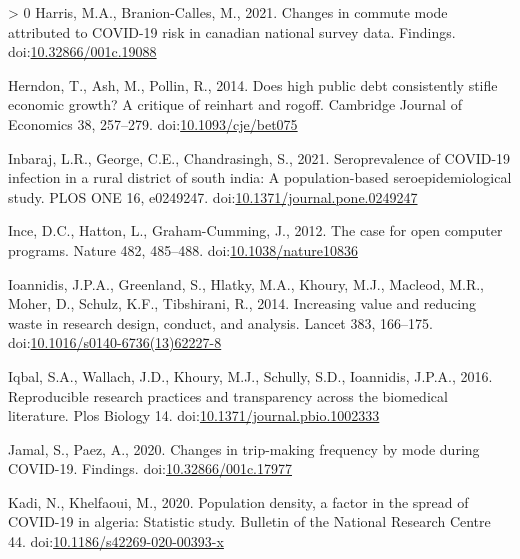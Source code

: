 \documentclass[]{elsarticle} %
\newlength{\cslhangindent}
\newenvironment{CSLReferences}[3] %
 {%
  \setlength{\parindent}{0pt}
  \ifodd #1 \everypar{\setlength{\hangindent}{\cslhangindent}}\ignorespaces\fi
  \ifnum #2 > 0
  \setlength{\parskip}{#2\baselineskip}
  \fi
 }%
 {}
\begin{document}
\begin{CSLReferences}{1}{0}
\leavevmode\hypertarget{ref-Harris2021Changes}{}%
Harris, M.A., Branion-Calles, M., 2021. Changes in commute mode
attributed to COVID-19 risk in canadian national survey data. Findings.
doi:\href{https://doi.org/10.32866/001c.19088}{10.32866/001c.19088}

\leavevmode\hypertarget{ref-Herndon2014high}{}%
Herndon, T., Ash, M., Pollin, R., 2014. Does high public debt
consistently stifle economic growth? A critique of reinhart and rogoff.
Cambridge Journal of Economics 38, 257--279.
doi:\href{https://doi.org/10.1093/cje/bet075}{10.1093/cje/bet075}

\leavevmode\hypertarget{ref-Inbaraj2021seroprevalence}{}%
Inbaraj, L.R., George, C.E., Chandrasingh, S., 2021. Seroprevalence of
COVID-19 infection in a rural district of south india: A
population-based seroepidemiological study. PLOS ONE 16, e0249247.
doi:\href{https://doi.org/10.1371/journal.pone.0249247}{10.1371/journal.pone.0249247}

\leavevmode\hypertarget{ref-Ince2012case}{}%
Ince, D.C., Hatton, L., Graham-Cumming, J., 2012. The case for open
computer programs. Nature 482, 485--488.
doi:\href{https://doi.org/10.1038/nature10836}{10.1038/nature10836}

\leavevmode\hypertarget{ref-Ioannidis2014increasing}{}%
Ioannidis, J.P.A., Greenland, S., Hlatky, M.A., Khoury, M.J., Macleod,
M.R., Moher, D., Schulz, K.F., Tibshirani, R., 2014. Increasing value
and reducing waste in research design, conduct, and analysis. Lancet
383, 166--175.
doi:\href{https://doi.org/10.1016/s0140-6736(13)62227-8}{10.1016/s0140-6736(13)62227-8}

\leavevmode\hypertarget{ref-Iqbal2016reproducible}{}%
Iqbal, S.A., Wallach, J.D., Khoury, M.J., Schully, S.D., Ioannidis,
J.P.A., 2016. Reproducible research practices and transparency across
the biomedical literature. Plos Biology 14.
doi:\href{https://doi.org/10.1371/journal.pbio.1002333}{10.1371/journal.pbio.1002333}

\leavevmode\hypertarget{ref-Jamal2020Changes}{}%
Jamal, S., Paez, A., 2020. Changes in trip-making frequency by mode
during COVID-19. Findings.
doi:\href{https://doi.org/10.32866/001c.17977}{10.32866/001c.17977}

\leavevmode\hypertarget{ref-Kadi2020population}{}%
Kadi, N., Khelfaoui, M., 2020. Population density, a factor in the
spread of COVID-19 in algeria: Statistic study. Bulletin of the National
Research Centre 44.
doi:\href{https://doi.org/10.1186/s42269-020-00393-x}{10.1186/s42269-020-00393-x}


\end{CSLReferences}
\end{document}
